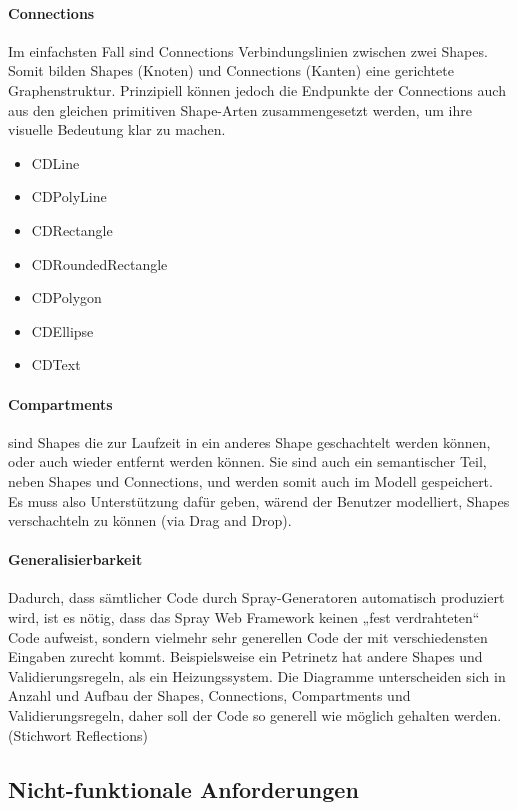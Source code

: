 \paragraph{Connections}

Im einfachsten Fall sind Connections Verbindungslinien zwischen
zwei Shapes. Somit bilden Shapes (Knoten) und Connections (Kanten)
eine gerichtete Graphenstruktur.
Prinzipiell können jedoch die Endpunkte der Connections auch aus den gleichen
primitiven Shape-Arten zusammengesetzt werden, um ihre visuelle Bedeutung
klar zu machen.

\begin{itemize}
  \item CDLine
  \item CDPolyLine
  \item CDRectangle
  \item CDRoundedRectangle
  \item CDPolygon
  \item CDEllipse
  \item CDText
\end{itemize}

\paragraph{Compartments}
sind Shapes die zur Laufzeit in ein anderes Shape geschachtelt werden können,
oder auch wieder entfernt werden können. Sie sind auch ein semantischer Teil,
neben Shapes und Connections, und werden somit auch im Modell gespeichert.
Es muss also Unterstützung dafür geben, wärend der Benutzer modelliert, Shapes
verschachteln zu können (via Drag and Drop).


\paragraph{Generalisierbarkeit}
Dadurch, dass sämtlicher Code durch Spray-Generatoren automatisch produziert wird,
ist es nötig, dass das Spray Web Framework keinen „fest verdrahteten“ Code
aufweist, sondern vielmehr sehr generellen Code der mit verschiedensten
Eingaben zurecht kommt.
Beispielsweise ein Petrinetz hat andere Shapes und Validierungsregeln,
als ein Heizungssystem. Die Diagramme unterscheiden sich in Anzahl und
Aufbau der Shapes, Connections, Compartments und Validierungsregeln,
daher soll der Code so generell wie möglich gehalten werden.
(Stichwort Reflections)

\subsection{Nicht-funktionale Anforderungen}

